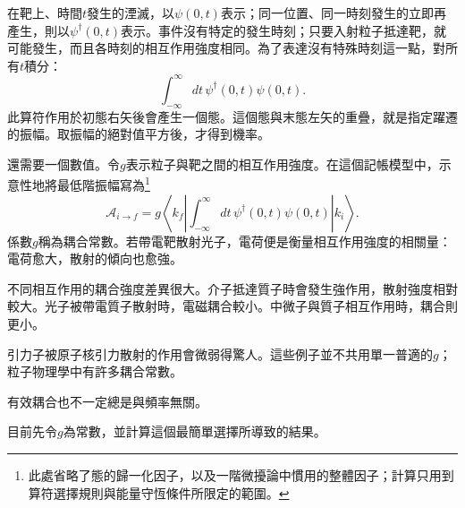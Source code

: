 在靶上、時間\(t\)發生的湮滅，以\(\psi(0,t)\)表示；同一位置、同一時刻發生的立即再產生，則以\(\psi^\dagger(0,t)\)表示。事件沒有特定的發生時刻；只要入射粒子抵達靶，就可能發生，而且各時刻的相互作用強度相同。為了表達沒有特殊時刻這一點，對所有\(t\)積分：
\begin{equation}
\int_{-\infty}^{\infty}dt\,\psi^\dagger(0,t)\psi(0,t).
\end{equation}
此算符作用於初態右矢後會產生一個態。這個態與末態左矢的重疊，就是指定躍遷的振幅。取振幅的絕對值平方後，才得到機率。

還需要一個數值。令\(g\)表示粒子與靶之間的相互作用強度。在這個記帳模型中，示意性地將最低階振幅寫為\footnote{此處省略了態的歸一化因子，以及一階微擾論中慣用的整體因子；計算只用到算符選擇規則與能量守恆條件所限定的範圍。}
\begin{equation}
\mathcal A_{i\to f}
=g\left\langle k_f\left|
\int_{-\infty}^{\infty}dt\,
\psi^\dagger(0,t)\psi(0,t)
\right|k_i\right\rangle.
\end{equation}
係數\(g\)稱為耦合常數。若帶電靶散射光子，電荷便是衡量相互作用強度的相關量：電荷愈大，散射的傾向也愈強。

不同相互作用的耦合強度差異很大。介子抵達質子時會發生強作用，散射強度相對較大。光子被帶電質子散射時，電磁耦合較小。中微子與質子相互作用時，耦合則更小。

\begin{classroomqa}
\end{classroomqa}

引力子被原子核引力散射的作用會微弱得驚人。這些例子並不共用單一普適的\(g\)；粒子物理學中有許多耦合常數。

有效耦合也不一定總是與頻率無關。

\begin{classroomqa}
\end{classroomqa}

目前先令\(g\)為常數，並計算這個最簡單選擇所導致的結果。

\begin{classroomqa}
\end{classroomqa}

